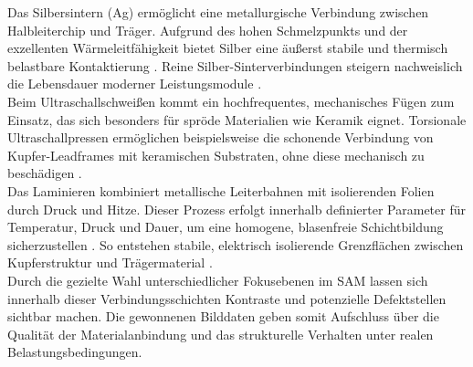Das Silbersintern (Ag) ermöglicht eine metallurgische Verbindung zwischen Halbleiterchip und Träger. Aufgrund des hohen Schmelzpunkts und der exzellenten Wärmeleitfähigkeit bietet Silber eine äußerst stabile und thermisch belastbare Kontaktierung \cite{fraunhoferSinter}. Reine Silber-Sinterverbindungen steigern nachweislich die Lebensdauer moderner Leistungsmodule \cite{fraunhoferSinter}.\\

Beim Ultraschallschweißen kommt ein hochfrequentes, mechanisches Fügen zum Einsatz, das sich besonders für spröde Materialien wie Keramik eignet. Torsionale Ultraschallpressen ermöglichen beispielsweise die schonende Verbindung von Kupfer-Leadframes mit keramischen Substraten, ohne diese mechanisch zu beschädigen \cite{telsonicWelding}.\\

Das Laminieren kombiniert metallische Leiterbahnen mit isolierenden Folien durch Druck und Hitze. Dieser Prozess erfolgt innerhalb definierter Parameter für Temperatur, Druck und Dauer, um eine homogene, blasenfreie Schichtbildung sicherzustellen \cite{tuBerlinLaminate}. So entstehen stabile, elektrisch isolierende Grenzflächen zwischen Kupferstruktur und Trägermaterial \cite{tuBerlinLaminate}.\\

Durch die gezielte Wahl unterschiedlicher Fokusebenen im SAM lassen sich innerhalb dieser Verbindungsschichten Kontraste und potenzielle Defektstellen sichtbar machen. Die gewonnenen Bilddaten geben somit Aufschluss über die Qualität der Materialanbindung und das strukturelle Verhalten unter realen Belastungsbedingungen.
